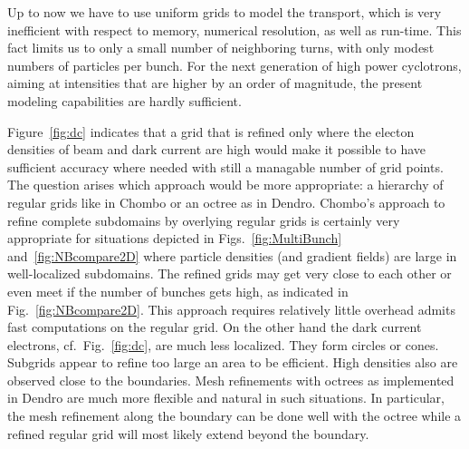 \documentclass[11pt,pdftex]{article}
\begin{document}

Up to now we have to use uniform grids to model the transport, which is
very inefficient with respect to memory, numerical resolution, as well
as run-time.  This fact limits us to only a small number of neighboring
turns, with only modest numbers of particles per bunch.  For the next
generation of high power cyclotrons, aiming at intensities that are
higher by an order of magnitude, the present modeling capabilities are
hardly sufficient.

Figure~\ref{fig:dc} indicates that a grid that is refined only where the
electon densities of beam and dark current are high would %
make it possible to have sufficient accuracy where needed with still a
managable number of grid points.  The question arises which approach
would be more appropriate: a hierarchy of regular grids like in \textsf{Chombo}
or an octree as in \textsf{Dendro}.  \textsf{Chombo}'s approach to refine complete
subdomains by overlying regular grids is certainly very appropriate for
situations depicted in Figs.~\ref{fig:MultiBunch}
and~\ref{fig:NBcompare2D} where particle densities (and gradient fields)
are large in well-localized subdomains.  The refined grids may get very
close to each other or even meet if the number of bunches gets high, as
indicated in Fig.~\ref{fig:NBcompare2D}.  This approach requires
relatively little overhead admits fast computations on the regular grid.
On the other hand the dark current electrons, cf.~Fig.~\ref{fig:dc}, are
much less localized.  They form circles or cones.  Subgrids appear to
refine too large an area to be efficient.
High densities also are observed close to the boundaries.  Mesh
refinements with octrees as implemented in \textsf{Dendro} are much more flexible
and natural in such situations.  In particular, the mesh refinement
along the boundary can be done well with the octree while a refined
regular grid will most likely extend beyond the boundary.
\end{document}
